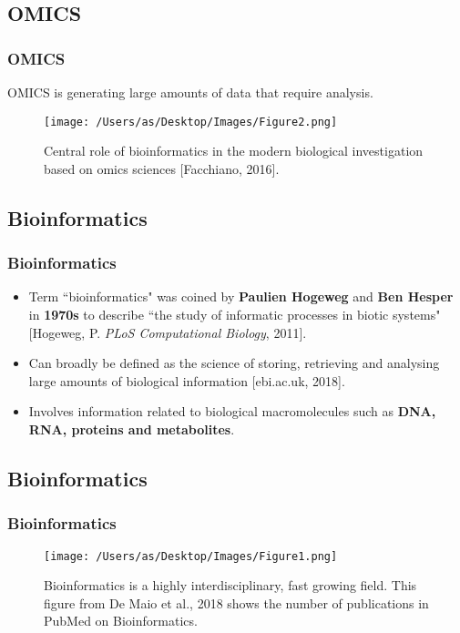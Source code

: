 \documentclass[11pt]{beamer}
\begin{document}
\subsection{OMICS}
\begin{frame}
\frametitle{OMICS}
\begin{center}
OMICS is generating large amounts of data that require analysis.  \\
\begin{figure}
\texttt{[image: /Users/as/Desktop/Images/Figure2.png]}
\caption{Central role of bioinformatics in the modern biological investigation based on omics sciences [Facchiano, 2016]. }
\end{figure}
\end{center} 
\end{frame}


\subsection{Bioinformatics}
\begin{frame}
\frametitle{Bioinformatics}
\begin{itemize}
\item Term ``bioinformatics" was coined by \textbf{Paulien Hogeweg} and \textbf{Ben Hesper} in \textbf{1970s} to describe ``the study of informatic processes in biotic systems" [Hogeweg, P. \textit{PLoS Computational Biology}, 2011].
\vspace{0.2in}
\item Can broadly be defined as the science of storing, retrieving and analysing large amounts of biological information [ebi.ac.uk, 2018].
\vspace{0.2in}
\item  Involves information related to biological macromolecules such as \textbf{DNA, RNA, proteins and metabolites}. 
\end{itemize}
\end{frame}

\subsection{Bioinformatics}
\begin{frame}
\frametitle{Bioinformatics}
\begin{center}
\begin{figure}
\texttt{[image: /Users/as/Desktop/Images/Figure1.png]}
\caption{Bioinformatics is a highly interdisciplinary, fast growing field. This figure from De Maio et al., 2018 shows the number of publications in PubMed on Bioinformatics.}
\end{figure}
\end{center} 
\end{frame}
\end{document}
